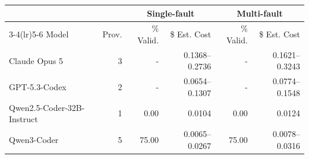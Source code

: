 \begin{tabular}{lrrrrr}
\toprule
& & \multicolumn{2}{c}{Single-fault} & \multicolumn{2}{c}{Multi-fault} \\
\cmidrule(lr){3-4}\cmidrule(lr){5-6}
Model & Prov. & \% Valid. & \$ Est. Cost & \% Valid. & \$ Est. Cost \\
\midrule
Claude Opus 5 & 3 & - & 0.1368--0.2736 & - & 0.1621--0.3243 \\
GPT-5.3-Codex & 2 & - & 0.0654--0.1307 & - & 0.0774--0.1548 \\
Qwen2.5-Coder-32B-Instruct & 1 & 0.00 & 0.0104 & 0.00 & 0.0124 \\
Qwen3-Coder & 5 & 75.00 & 0.0065--0.0267 & 75.00 & 0.0078--0.0316 \\
\bottomrule
\end{tabular}